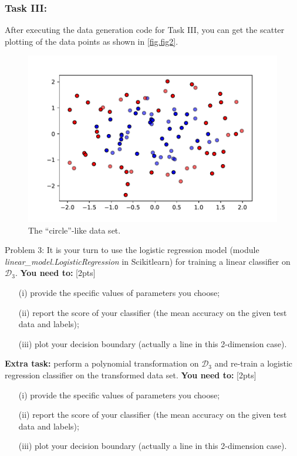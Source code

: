 \documentclass[10pt]{article}
\begin{document}
\newpage
\subsubsection{Task III:}
After executing the data generation code for Task III, you can get the scatter plotting of the data points as shown in \ref{fig.fig2}.

\begin{figure}[h!]
	\centering
	\includegraphics[width=0.7\linewidth]{fig3}
	\caption{The ``circle''-like data set.}
	\label{fig.fig3}
\end{figure}

{\color{red}Problem 3:} It is your turn to use the logistic regression model (module \emph{linear\_model.LogisticRegression} in Scikitlearn) for training a linear classifier on $\mathcal{D}_3$. \textbf{You need to:} {\color{red}[2pts]}
\begin{enumerate}
	\item[(i)] provide the specific values of parameters you choose;
	\item[(ii)] report the score of your classifier (the mean accuracy on the given test data and labels);
	\item[(iii)] plot your decision boundary (actually a line in this 2-dimension case).  
\end{enumerate}
\textbf{Extra task:} perform a polynomial transformation on $\mathcal{D}_3$ and re-train a logistic regression classifier on the transformed data set. \textbf{You need to:} {\color{red}[2pts]}
\begin{enumerate}
	\item[(i)] provide the specific values of parameters you choose;
	\item[(ii)] report the score of your classifier (the mean accuracy on the given test data and labels);
	\item[(iii)] plot your decision boundary (actually a line in this 2-dimension case).  
\end{enumerate}
\end{document}
